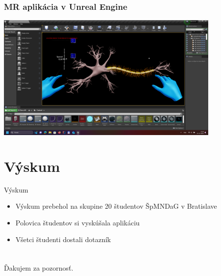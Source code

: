 \documentclass[pdf]{beamer}
\begin{document}
\begin{frame}
    \frametitle{MR aplikácia v Unreal Engine}
    \begin{center}
        \includegraphics[width=11cm]{img/unreal.png}
    \end{center}
\end{frame}

\section{Výskum}
\begin{frame}{Výskum}
    \begin{itemize}
        \item Výskum prebehol na skupine 20 študentov ŠpMNDaG v Bratislave
        \item Polovica študentov si vyskúšala aplikáciu
        \item Všetci študenti dostali dotazník
    \end{itemize}    
\end{frame}

    

    

\section*{}
\begin{frame}{}
    Ďakujem za pozornosť.
\end{frame}
\end{document}
